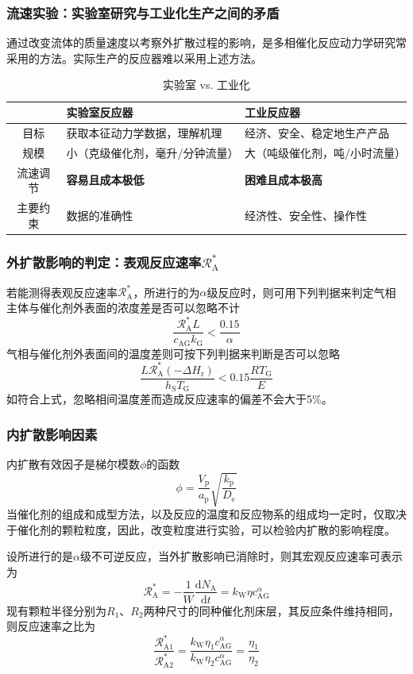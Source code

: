 \documentclass[dvipsnames, svgnames, x11names]{beamer}
\begin{document}
\begin{frame}
    \frametitle{流速实验：实验室研究与工业化生产之间的矛盾}
    通过改变流体的质量速度以考察外扩散过程的影响，是多相催化反应动力学研究常采用的方法。实际生产的反应器难以采用上述方法。
    \begin{table}
        \centering
        \caption{实验室 vs. 工业化}
        \begin{tabularx}{\textwidth}{cXX}
            \bottomrule
             & 实验室反应器 & 工业反应器 \\ \hline
            目标 & 获取本征动力学数据，理解机理 & 经济、安全、稳定地生产产品 \\ 
            规模 & 小（克级催化剂，毫升/分钟流量） & 大（吨级催化剂，吨/小时流量） \\ 
            流速调节 & \bf{容易且成本极低} & \bf{困难且成本极高} \\
            主要约束 & 数据的准确性 & 经济性、安全性、操作性 \\ \toprule
        \end{tabularx}
    \end{table}

\end{frame}


\begin{frame}
    \frametitle{外扩散影响的判定：表观反应速率$\mathscr{R}_{\mathrm{A}}^{*}$}

    若能测得表观反应速率$\mathscr{R}_{\mathrm{A}}^{*}$，所进行的为$\alpha$级反应时，则可用下列判据来判定气相主体与催化剂外表面的浓度差是否可以忽略不计
    \[
        \frac{\mathscr{R}_{\mathrm{A}}^{*} L}{c_{\mathrm{AG}} k_{\mathrm{G}}}<\frac{0.15}{\alpha}
    \]
    气相与催化剂外表面间的温度差则可按下列判据来判断是否可以忽略
    \[
        \frac{L \mathscr{R}_{\mathrm{A}}^{*}\left(-\Delta H_{\mathrm{r}}\right)}{h_{\mathrm{S}} T_{\mathrm{G}}}<0.15 \frac{R T_{\mathrm{G}}}{E} 
    \]
    如符合上式，忽略相间温度差而造成反应速率的偏差不会大于5\%。

\end{frame}


\begin{frame}
    \frametitle{内扩散影响因素}

    内扩散有效因子是梯尔模数$\phi$的函数
    \[
        \phi=\frac{V_{\mathrm{p}}}{a_{\mathrm{p}}} \sqrt{\frac{k_{\mathrm{p}}}{D_{\mathrm{e}}}}
    \]
    当催化剂的组成和成型方法，以及反应的温度和反应物系的组成均一定时，仅取决于催化剂的颗粒粒度，因此，改变粒度进行实验，可以检验内扩散的影响程度。

    设所进行的是$\alpha$级不可逆反应，当外扩散影响已消除时，则其宏观反应速率可表示为
    \[
        \mathscr{R}_{\mathrm{A}}^{*}=-\frac{1}{W} \frac{\mathrm{d} N_{\mathrm{A}}}{\mathrm{d} t}=k_{\mathrm{W}} \eta c_\mathrm{AG}^ \alpha
    \]
    现有颗粒半径分别为$R_1$、$R_2$两种尺寸的同种催化剂床层，其反应条件维持相同，则反应速率之比为
    \[
        \frac{\mathscr{R}_{\mathrm{A} 1}^{*}}{\mathscr{R}_{\mathrm{A} 2}^{*}}=\frac{k_{\mathrm{W}} \eta_{1} c_{\mathrm{AG}}^{\alpha}}{k_{\mathrm{W}} \eta_{2} c_{\mathrm{AG}}^{\alpha}}=\frac{\eta_{1}}{\eta_{2}} 
    \]

\end{frame}
\end{document}

